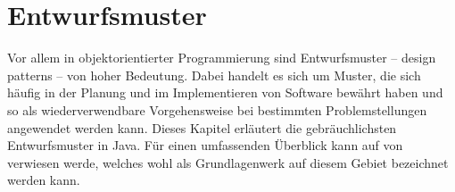 \section{Entwurfsmuster}

Vor allem in objektorientierter Programmierung sind Entwurfsmuster -- \engl design patterns -- von hoher Bedeutung. Dabei handelt es sich um Muster, die sich häufig in der Planung und im Implementieren von Software bewährt haben und so als wiederverwendbare Vorgehensweise bei bestimmten Problemstellungen angewendet werden kann. Dieses Kapitel erläutert die gebräuchlichsten Entwurfsmuster in Java. Für einen umfassenden Überblick kann auf  von \citeauthor{gamma_design_1995} verwiesen werde, welches wohl als Grundlagenwerk auf diesem Gebiet bezeichnet werden kann.




